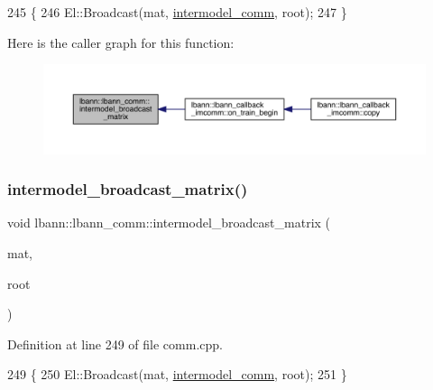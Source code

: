 \begin{DoxyCode}
245                                                                \{
246   El::Broadcast(mat, \hyperlink{classlbann_1_1lbann__comm_a2c51c5d8faf4f0ab4f43b892c55e597b}{intermodel\_comm}, root);
247 \}
\end{DoxyCode}
Here is the caller graph for this function\+:\nopagebreak
\begin{figure}[H]
\begin{center}
\leavevmode
\includegraphics[width=350pt]{classlbann_1_1lbann__comm_a4989229db1ee858c5a2170a989653d0b_icgraph}
\end{center}
\end{figure}
\mbox{\label{classlbann_1_1lbann__comm_a7fb6be066a634169cb41cef3f98032f0}} 
\subsubsection{\texorpdfstring{intermodel\+\_\+broadcast\+\_\+matrix()}{intermodel\_broadcast\_matrix()}\hspace{0.1cm}{\footnotesize\ttfamily [2/2]}}
{\footnotesize\ttfamily void lbann\+::lbann\+\_\+comm\+::intermodel\+\_\+broadcast\+\_\+matrix (\begin{DoxyParamCaption}\item[{\hyperlink{base_8hpp_a9a697a504ae84010e7439ffec862b470}{Abs\+Dist\+Mat} \&}]{mat,  }\item[{int}]{root }\end{DoxyParamCaption})}



Definition at line 249 of file comm.\+cpp.


\begin{DoxyCode}
249                                                                       \{
250   El::Broadcast(mat, \hyperlink{classlbann_1_1lbann__comm_a2c51c5d8faf4f0ab4f43b892c55e597b}{intermodel\_comm}, root);
251 \}
\end{DoxyCode}
\mbox{\label{classlbann_1_1lbann__comm_a142c396a4d4a2c16ee234b813e7e45a6}} 
